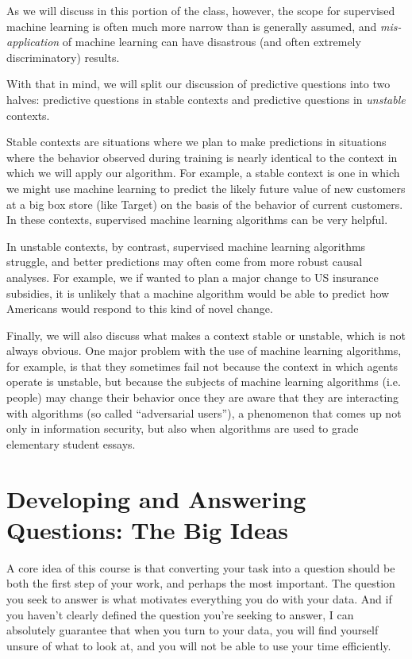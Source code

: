 \documentclass[12pt]{article}
\begin{document}
As we will discuss in this portion of the class, however, the scope for supervised machine learning is often much more narrow than is generally assumed, and \emph{mis-application} of machine learning can have disastrous (and often extremely discriminatory) results.

With that in mind, we will split our discussion of predictive questions into two halves: predictive questions in stable contexts and predictive questions in \emph{unstable} contexts.

Stable contexts are situations where we plan to make predictions in situations where the behavior observed during training is nearly identical to the context in which we will apply our algorithm. For example, a stable context is one in which we might use machine learning to predict the likely future value of new customers at a big box store (like Target) on the basis of the behavior of current customers. In these contexts, supervised machine learning algorithms can be very helpful.

In unstable contexts, by contrast, supervised machine learning algorithms struggle, and better predictions may often come from more robust causal analyses. For example, we if wanted to plan a major change to US insurance subsidies, it is unlikely that a machine algorithm would be able to predict how Americans would respond to this kind of novel change.

Finally, we will also discuss what makes a context stable or unstable, which is not always obvious. One major problem with the use of machine learning algorithms, for example, is that they sometimes fail not because the context in which agents operate is unstable, but because the subjects of machine learning algorithms (i.e. people) may change their behavior once they are aware that they are interacting with algorithms (so called ``adversarial users''), a phenomenon that comes up not only in information security, but also when algorithms are used to grade elementary student essays.

\section{Developing and Answering Questions: The Big Ideas}


A core idea of this course is that converting your task into a question should be both the first step of your work, and perhaps the most important. The question you seek to answer is what motivates everything you do with your data. And if you haven't clearly defined the question you're seeking to answer, I can absolutely guarantee that when you turn to your data, you will find yourself unsure of what to look at, and you will not be able to use your time efficiently.
\end{document}
